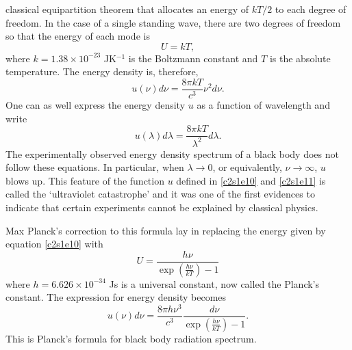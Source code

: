classical equipartition theorem that allocates an energy of $kT/2$ to each
degree of freedom. In the case of a single standing wave, there are two degrees
of freedom so that the energy of each mode is
\begin{equation}\label{c2s1e10}
U = kT,
\end{equation}
where $k = 1.38 \times 10^{-23}$ JK${}^{-1}$ is the Boltzmann constant and $T$
is the absolute temperature. The energy density is, therefore,
\begin{equation}\label{c2s1e11}
u(\nu)d\nu = \frac{8\pi kT}{c^3}\nu^2 d\nu.
\end{equation}
One can as well express the energy density $u$ as a function of wavelength and
write
\begin{equation}\label{c2s1e12}
u(\lambda)d\lambda = \frac{8\pi kT}{\lambda^2}d\lambda.
\end{equation}
The experimentally observed energy density spectrum of a black body does not
follow these equations. In particular, when $\lambda \rightarrow 0$, or 
equivalently, $\nu \rightarrow \infty$, $u$ blows up. This feature of the 
function $u$ defined in \eqref{c2s1e10} and \eqref{c2s1e11} is called the
`ultraviolet catastrophe' and it was one of the first evidences to indicate 
that certain experiments cannot be explained by classical physics.

Max Planck's correction to this formula lay in replacing the energy given by
equation \eqref{c2s1e10} with
\begin{equation}\label{c2s1e13}
U = \frac{h\nu}{\exp(\frac{h\nu}{kT}) - 1}
\end{equation}
where $h = 6.626 \times 10^{-34}$ Js is a universal constant, now called the
Planck's constant. The expression for energy density becomes
\begin{equation}\label{c2s1e14}
u(\nu)d\nu = \frac{8\pi h\nu^3}{c^3}\frac{d\nu}{\exp(\frac{h\nu}{kT}) - 1}.
\end{equation}
This is Planck's formula for black body radiation spectrum. 

